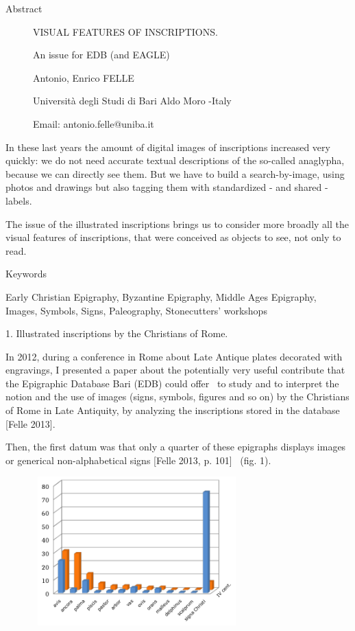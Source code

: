 \documentclass[amsthm,ebook]{saparticle}
\title{}
\author{A\&D\&F\&L}
\date{2015-11-15}
\begin{document}
Abstract

\begin{figure}
\centering
\begin{minipage}{10.901cm}
VISUAL FEATURES OF INSCRIPTIONS.

An issue for EDB (and EAGLE)\newline


Antonio, Enrico FELLE

Università degli Studi di Bari {\textquotedbl}Aldo Moro{\textquotedbl} -Italy 

Email: antonio.felle@uniba.it
\end{minipage}
\end{figure}
In these last years the amount of digital images of inscriptions increased very quickly: we do not need accurate textual
descriptions of the so-called anaglypha, because we can directly see them. But we have to build a search-by-image,
using photos and drawings but also tagging them with standardized - and shared - labels. 

The issue of the {\textquotedbl}illustrated inscriptions{\textquotedbl} brings us to consider more broadly all the
visual features of inscriptions, that were conceived as objects to see, not only to read.


\bigskip


\bigskip

Keywords

Early Christian Epigraphy, Byzantine Epigraphy, Middle Ages Epigraphy, Images, Symbols, Signs, Paleography,
Stonecutters’ workshops 


\bigskip

1. {\textquotedbl}Illustrated inscriptions{\textquotedbl} by the Christians of Rome.


\bigskip

In 2012, during a conference in Rome about Late Antique plates decorated with engravings, I presented a paper about the
potentially very useful contribute that the Epigraphic Database Bari (EDB) could offer \ to study and to interpret the
notion and the use of images (signs, symbols, figures and so on) by the Christians of Rome in Late Antiquity, by
analyzing the inscriptions stored in the database [Felle 2013]. 

Then, the first datum was that only a quarter of these epigraphs displays images or generical non-alphabetical signs
[Felle 2013, p. 101] \ (fig. 1).

 \includegraphics[width=10.119cm,height=5.74cm]{FelleVisualFeaturesofinscriptionsEAGLE2016FullPaper-img001.pdf} 
\end{document}
